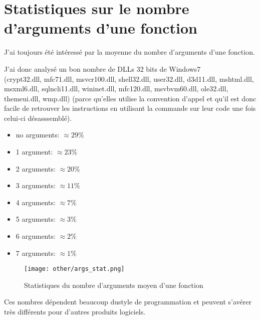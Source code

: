 ﻿\section{Statistiques sur le nombre d'arguments d'une fonction}
\label{args_stat}

J'ai toujours été intéressé par la moyenne du nombre d'arguments d'une fonction.

J'ai donc analysé un bon nombre de DLLs 32 bits de Windows7\\
(crypt32.dll, mfc71.dll, msvcr100.dll, shell32.dll, 
user32.dll, d3d11.dll, mshtml.dll, msxml6.dll, sqlncli11.dll, wininet.dll, mfc120.dll, msvbvm60.dll, 
ole32.dll, themeui.dll, wmp.dll) 
(parce qu'elles utilise la convention d'appel  et qu'il est donc facile de retrouver 
les instructions  en utilisant la commande  sur leur code une fois celui-ci 
désasssemblé).

\begin{itemize}
\item no arguments: $\approx 29\%$
\item 1 argument: $\approx 23\%$
\item 2 arguments: $\approx 20\%$
\item 3 arguments: $\approx 11\%$
\item 4 arguments: $\approx 7\%$
\item 5 arguments: $\approx 3\%$
\item 6 arguments: $\approx 2\%$
\item 7 arguments: $\approx 1\%$
\end{itemize}

\begin{figure}[H]
\centering
\texttt{[image: other/args\_stat.png]}
\caption{Statistiques du nombre d'arguments moyen d'une fonction}
\end{figure}

Ces nombres dépendent beaucoup dustyle de programmation et peuvent s'avérer très différents pour 
d'autres produits logiciels.

